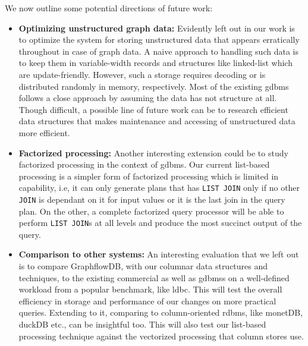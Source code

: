 We now outline some potential directions of future work:
\begin{itemize}
	\item \textbf{Optimizing unstructured graph data:} Evidently left out in our work is to optimize the system for storing unstructured data that appears erratically throughout in case of graph data. A naive approach to handling such data is to keep them in variable-width records and structures like linked-list which are update-friendly. However, such a storage requires decoding or is distributed randomly in memory, respectively. Most of the existing \gls{gdbms} follows a close approach by assuming the data has not structure at all. Though difficult, a possible line of future work can be to research efficient data structures that makes maintenance and accessing of unstructured data more efficient. 
	
	\item \textbf{Factorized processing:} Another interesting extension could be to study factorized processing in the context of \gls{gdbms}. Our current list-based processing is a simpler form of factorized processing which is limited in capability, i.e, it can only generate plans that has \texttt{LIST JOIN} only if no other \texttt{JOIN} is dependant on it for input values or it is the last join in the query plan. On the other, a complete factorized query processor will be able to perform \texttt{LIST JOIN}s at all levels and produce the most succinct output of the query.
	
	\item \textbf{Comparison to other systems: }An interesting evaluation that we left out is to compare GraphflowDB, with our columnar data structures and techniques, to the existing commercial as well as \gls{gdbms}s on a well-defined workload from a popular benchmark, like \gls{ldbc}. This will test the overall efficiency in storage and performance of our changes on more practical queries. Extending to it, comparing to column-oriented \gls{rdbms}, like monetDB, duckDB etc., can be insightful too. This will also test our list-based processing technique against the vectorized processing that column stores use. 
	
\end{itemize}


